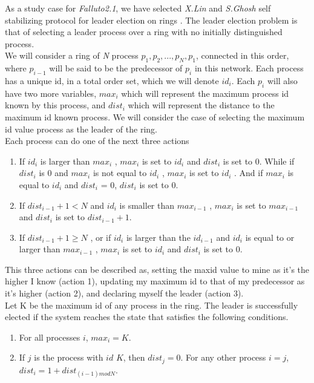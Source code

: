 \documentclass[12pt]{article}
\newcommand{\falluto}{\mbox{\textit{Falluto2.1}}}
\begin{document}
As a study case for \falluto, we have selected \textit{X.Lin} and \textit{S.Ghosh} self stabilizing protocol for leader election on rings \cite{linghosh, ghoshgupta, yokogawa, hammes}. The leader election problem is that of selecting a leader process over a ring with no initially distinguished process.\\
We will consider a ring of \textit{N} process $p_1,p_2,...,p_N,p_1$, connected in this order, where $p_{i-1}$ will be said to be the predecessor of $p_i$ in this network. Each process has a unique id, in a total order set, which we will denote $id_i$. Each $p_i$ will also have two more variables, $max_i$ which will represent the maximum process id known by this process, and $dist_i$ which will represent the distance to the maximum id known process. We will consider the case of selecting the maximum id value process as the leader of the ring.\\
Each process can do one of the next three actions
\begin{enumerate}
\item If $id_i$ is larger than $max_i$ , $max_i$ is set to $id_i$ and $dist_i$ is set to $0$. While if $dist_i$ is $0$ and $max_i$ is not equal to $id_i$ , $max_i$ is set to $id_i$ . And if $max_i$ is equal to $id_i$ and $dist_i$ = $0$, $dist_i$ is set to $0$.

\item If $dist_{i-1} + 1 < N$ and $id_i$ is smaller than $max_{i-1}$ , $max_i$ is set to $max_{i-1}$ and $dist_i$ is set to $dist_{i-1} + 1$.

\item If $dist_{i-1} + 1 \geq N$ , or if $id_i$ is larger than the $id_{i-1}$ and $id_i$ is equal to or larger than $max_{i-1}$ , $max_i$ is set to $id_i$ and $dist_i$ is set to $0$.
\end{enumerate}

This three actions can be described as, setting the maxid value to mine as it's the higher I know (action 1), updating my maximum id to that of my predecessor as it's higher (action 2), and declaring myself the leader (action 3).\\
Let K be the maximum id of any process in the ring. The leader is successfully elected if the system reaches the state that satisfies the following conditions.
\begin{enumerate}
\item For all processes $i$, $max_i = K$.

\item If $j$ is the process with $id$ $K$, then $dist_j = 0$. For any other process $i = j$, $dist_i =
1 + dist_{(i-1) mod N}$.
\end{enumerate}
\end{document}
